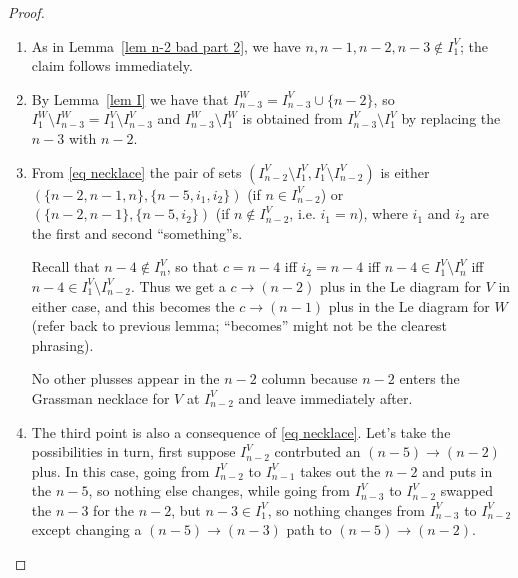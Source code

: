 \documentclass[11pt]{article}
\theoremstyle{remark}
\theoremstyle{definition}
\begin{document}
\begin{proof}
\begin{enumerate}  

\item As in Lemma~\ref{lem n-2 bad part 2}, we have $n,n-1,n-2,n-3 \not\in I_1^V$; the claim follows immediately.

\item By Lemma~\ref{lem I} we have that $I_{n-3}^W = I_{n-3}^V \cup \{n-2\}$, so $I_{1}^W \setminus I_{n-3}^W = I_1^V \setminus I_{n-3}^V$ and $I_{n-3}^W \setminus I_1^W$ is obtained from $I_{n-3}^V \setminus I_{1}^V$ by replacing the $n-3$ with $n-2$.    

\item From \eqref{eq necklace} the pair of sets $(I_{n-2}^V\setminus I_1^V, I_1^V\setminus I_{n-2}^V)$ is either $(\{n-2, n-1, n\}, \{n-5, i_1, i_2\})$ (if $n \in I_{n-2}^V$) or $(\{n-2, n-1\}, \{n-5, i_2\})$ (if $n \not\in I_{n-2}^V$, i.e. $i_1 = n$), where $i_1$ and $i_2$ are the first and second ``something''s. 

Recall that $n-4 \not\in I_n^V$, so that $c = n-4$ iff $i_2 = n-4$ iff $n-4 \in I_1^V\setminus I_n^V$ iff $n-4 \in I_1^V \setminus I_{n-2}^V$. Thus we get a $c \rightarrow (n-2)$ plus in the Le diagram for $V$ in either case, and this becomes the $c \rightarrow (n-1)$ plus in the Le diagram for $W$ (refer back to previous lemma; ``becomes'' might not be the clearest phrasing).

No other plusses appear in the $n-2$ column because $n-2$ enters the Grassman necklace for $V$ at $I_{n-2}^V$ and leave immediately after.
  \item 
    The third point is also a consequence of \eqref{eq necklace}.  Let's take the possibilities in turn, first suppose $I_{n-2}^V$ contrbuted an $(n-5)\rightarrow (n-2)$ plus.  In this case, going from $I_{n-2}^V$ to $I_{n-1}^V$ takes out the $n-2$ and puts in the $n-5$, so  nothing else changes, while going from $I_{n-3}^V$ to $I_{n-2}^V$ swapped the $n-3$ for the $n-2$, but $n-3\in I_1^V$, so nothing changes from $I_{n-3}^V$ to $I_{n-2}^V$ except changing a $(n-5)\rightarrow (n-3)$ path to $(n-5)\rightarrow (n-2)$.


\end{enumerate}
\end{proof}
\end{document}
